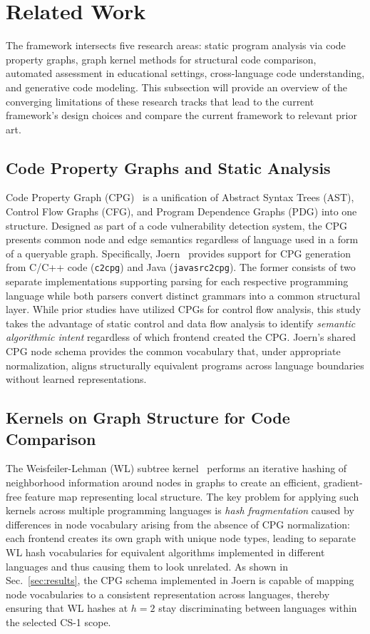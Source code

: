 \section{Related Work}
\label{sec:related_work}

The framework intersects five research areas: static program analysis via code property graphs, graph kernel methods for structural code comparison, automated assessment in educational settings, cross-language code understanding, and generative code modeling. This subsection will provide an overview of the converging limitations of these research tracks that lead to the current framework's design choices and compare the current framework to relevant prior art.

\subsection{Code Property Graphs and Static Analysis}
Code Property Graph (CPG)~\cite{ref_yamaguchi2014} is a unification of Abstract Syntax Trees (AST), Control Flow Graphs (CFG), and Program Dependence Graphs (PDG) into one structure. Designed as part of a code vulnerability detection system, the CPG presents common node and edge semantics regardless of language used in a form of a queryable graph. Specifically, Joern~\cite{ref_joern_platform} provides support for CPG generation from C/C++ code (\texttt{c2cpg}) and Java (\texttt{javasrc2cpg}). The former consists of two separate implementations supporting parsing for each respective programming language while both parsers convert distinct grammars into a common structural layer. While prior studies have utilized CPGs for control flow analysis, this study takes the advantage of static control and data flow analysis to identify \textit{semantic algorithmic intent} regardless of which frontend created the CPG. Joern's shared CPG node schema provides the common vocabulary that, under appropriate normalization, aligns structurally equivalent programs across language boundaries without learned representations.

\subsection{Kernels on Graph Structure for Code Comparison}
The Weisfeiler-Lehman (WL) subtree kernel~\cite{ref_shervashidze2011,ref_weisfeiler68} performs an iterative hashing of neighborhood information around nodes in graphs to create an efficient, gradient-free feature map representing local structure. The key problem for applying such kernels across multiple programming languages is \textit{hash fragmentation} caused by differences in node vocabulary arising from the absence of CPG normalization: each frontend creates its own graph with unique node types, leading to separate WL hash vocabularies for equivalent algorithms implemented in different languages and thus causing them to look unrelated. As shown in Sec.~\ref{sec:results}, the CPG schema implemented in Joern is capable of mapping node vocabularies to a consistent representation across languages, thereby ensuring that WL hashes at $h=2$ stay discriminating between languages within the selected CS-1 scope.

